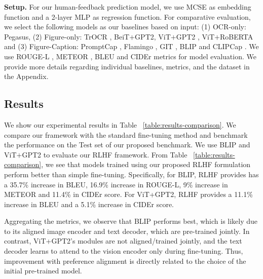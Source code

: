 \documentclass[11pt]{article}
\renewcommand{\cite}[1]{\citep{#1}}
\begin{document}
\noindent\textbf{Setup.}
For our human-feedback prediction model, we use MCSE \cite{zhang2022mcse} as embedding function and a 2-layer MLP as regression function. For comparative evaluation, we select the following models as our baselines based on input: (1) OCR-only: Pegasus\cite{zhang2020pegasus}, (2) Figure-only: TrOCR \cite{li2021trocr}, BeiT$+$GPT2, ViT$+$GPT2 \cite{dosovitskiy2020vit}, ViT$+$RoBERTA \cite{dosovitskiy2020vit, liu2019roberta} and (3) Figure-Caption: PromptCap \cite{hu2022promptcap}, Flamingo \cite{alayrac2022flamingo}, GIT \cite{wang2022git}, BLIP \cite{li2022blip} and CLIPCap \cite{mokady2021clipcap}. We use ROUGE-L \cite{lin-2004-rouge}, METEOR \cite{banerjee2005meteor}, BLEU \cite{papineni2002bleu} and CIDEr \cite{vedantam2015cider} metrics for model evaluation. We provide more details regarding individual baselines, metrics, and the dataset in the Appendix.


\subsection{Results}
We show our experimental results in Table ~\ref{table:results-comparison}. We compare our framework with the standard fine-tuning method and benchmark the performance on the Test set of our proposed benchmark. We use BLIP and ViT$+$GPT2 to evaluate our RLHF framework.
From Table ~\ref{table:results-comparison}, we see that models trained using our proposed RLHF formulation perform better than simple fine-tuning.
Specifically, for BLIP, RLHF provides has a 35.7\% increase in BLEU, 16.9\% increase in ROUGE-L, 9\% increase in METEOR and 11.4\% in CIDEr score.
For ViT+GPT2, RLHF provides a 11.1\% increase in BLEU and a 5.1\% increase in CIDEr score.

Aggregating the metrics, we observe that BLIP performs best, which is likely due to its aligned image encoder and text decoder, which are pre-trained jointly. In contrast, ViT+GPT2's modules are not aligned/trained jointly, and the text decoder learns to attend to the vision encoder only during fine-tuning. Thus, improvement with preference alignment is directly related to the choice of the initial pre-trained model. 

\end{document}
